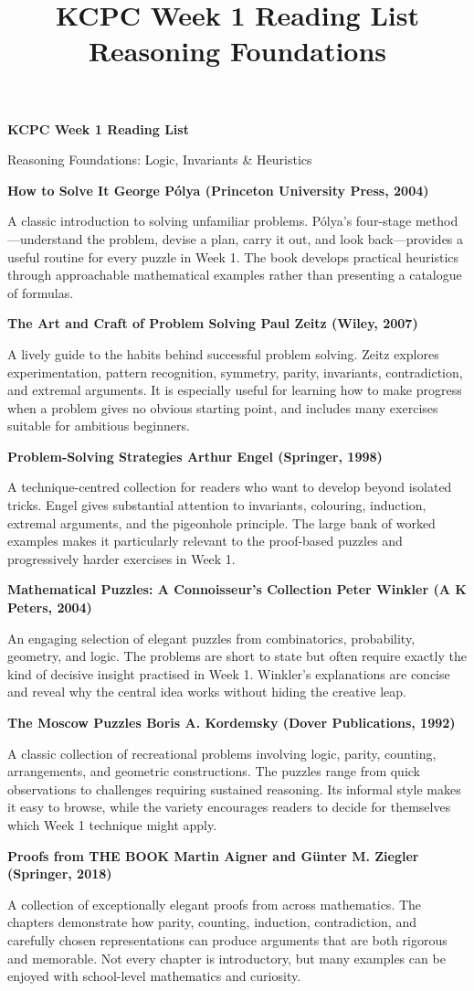 \documentclass[11pt]{article}
\title{KCPC Week 1 Reading List\\Reasoning Foundations}
\author{}
\date{}
\newcommand{\bookentry}[2]{\textbf{#1}\par #2\par\vspace{7pt}}
\begin{document}
\thispagestyle{fancy}

\begin{center}
    {\LARGE\bfseries KCPC Week 1 Reading List}\par
    \vspace{2pt}
    {\large Reasoning Foundations: Logic, Invariants \& Heuristics}
\end{center}
\vspace{5pt}

\bookentry{How to Solve It George P\'olya (Princeton University
Press, 2004)}{A classic introduction to solving unfamiliar problems.
    P\'olya's four-stage method---understand the problem, devise a plan,
    carry it out, and look back---provides a useful routine for every
    puzzle in Week 1. The book develops practical heuristics through
    approachable mathematical examples rather than presenting a catalogue
of formulas.}

\bookentry{The Art and Craft of Problem Solving Paul Zeitz (Wiley,
2007)}{A lively guide to the habits behind successful problem
    solving. Zeitz explores experimentation, pattern recognition,
    symmetry, parity, invariants, contradiction, and extremal arguments.
    It is especially useful for learning how to make progress when a
    problem gives no obvious starting point, and includes many exercises
suitable for ambitious beginners.}

\bookentry{Problem-Solving Strategies Arthur Engel (Springer,
1998)}{A technique-centred collection for readers who want to develop
    beyond isolated tricks. Engel gives substantial attention to
    invariants, colouring, induction, extremal arguments, and the
    pigeonhole principle. The large bank of worked examples makes it
    particularly relevant to the proof-based puzzles and progressively
harder exercises in Week 1.}

\bookentry{Mathematical Puzzles: A Connoisseur's Collection Peter
Winkler (A K Peters, 2004)}{An engaging selection of elegant puzzles
    from combinatorics, probability, geometry, and logic. The problems
    are short to state but often require exactly the kind of decisive
    insight practised in Week 1. Winkler's explanations are concise and
reveal why the central idea works without hiding the creative leap.}

\bookentry{The Moscow Puzzles Boris A. Kordemsky (Dover Publications,
1992)}{A classic collection of recreational problems involving logic,
    parity, counting, arrangements, and geometric constructions. The
    puzzles range from quick observations to challenges requiring
    sustained reasoning. Its informal style makes it easy to browse,
    while the variety encourages readers to decide for themselves which
Week 1 technique might apply.}

\bookentry{Proofs from THE BOOK Martin Aigner and G\"unter M. Ziegler
(Springer, 2018)}{A collection of exceptionally elegant proofs from
    across mathematics. The chapters demonstrate how parity, counting,
    induction, contradiction, and carefully chosen representations can
    produce arguments that are both rigorous and memorable. Not every
    chapter is introductory, but many examples can be enjoyed with
school-level mathematics and curiosity.}
\end{document}
